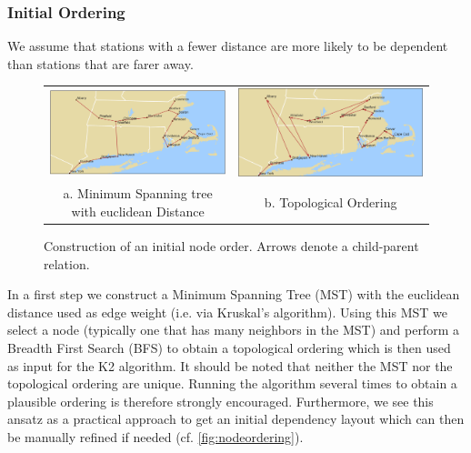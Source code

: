 \documentclass{article}
\begin{document}
\subsubsection{Initial Ordering}
We assume that stations with a fewer distance are more likely to be dependent than stations that are farer away. 
\begin{figure}
\centering
\begin{tabular}{cc}
\includegraphics[scale=0.35]{../images/euclid.png} & \includegraphics[scale=0.35]{../images/top.png} \\
a. Minimum Spanning tree with euclidean Distance & b. Topological Ordering
\end{tabular}
\caption{Construction of an initial node order. Arrows denote a child-parent relation.}
\label{fig:nodeordering}
\end{figure}
In a first step we construct a Minimum Spanning Tree (MST) with the euclidean distance used as edge weight (i.e. via Kruskal's algorithm\cite{kruskal}). Using this MST we select a node (typically one that has many neighbors in the MST) and perform a Breadth First Search (BFS) to obtain a topological ordering which is then used as input for the K2 algorithm. It should be noted that neither the MST nor the topological ordering are unique. Running the algorithm several times to obtain a plausible ordering is therefore strongly encouraged. Furthermore, we see this ansatz as a practical approach to get an initial dependency layout which can then be manually refined if needed (cf. \autoref{fig:nodeordering}).
\end{document}

